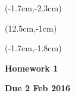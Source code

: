 \documentclass[12pt, oneside]{article}
\begin{document}


\begin{textblock*}{4cm}(-1.7cm,-2.3cm)
\end{textblock*}

\begin{textblock*}{8cm}(12.5cm,-1cm)
\end{textblock*}
\begin{textblock*}{13.5cm}(-1.7cm,-1.8cm)
\end{textblock*}

\vspace{1cm}

\begin{center}
\textbf{\Large Homework 1}

\textbf{Due 2 Feb 2016}
\end{center}
\end{document}
